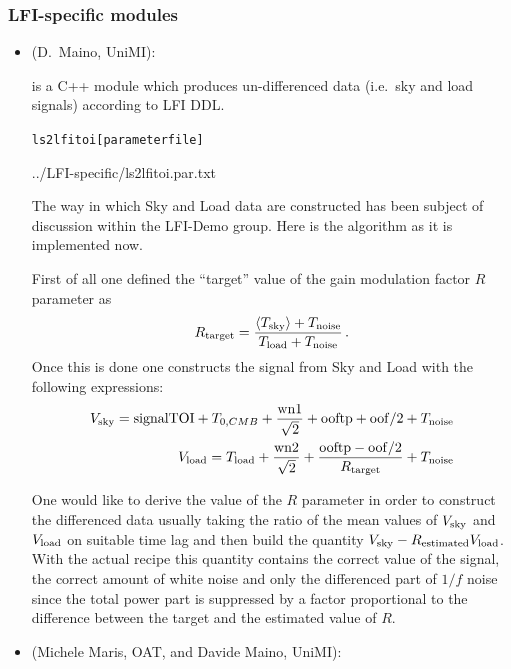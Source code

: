 \subsubsection{LFI-specific modules}

\begin{itemize}
\item {} (D.~Maino, UniMI):

 is a C++ module which produces un-differenced data
(i.e.\ sky and load signals) according to LFI DDL.

\begin{alltt}
ls2lfitoi [parameter file]
\end{alltt}
 {../LFI-specific/ls2lfitoi.par.txt}

The way in which Sky and Load data are constructed has been subject
of discussion within the LFI-Demo group. Here is the algorithm as
it is implemented now.

First of all one defined the ``target'' value of the gain modulation
factor $R$ parameter as
\begin{equation}
R_{\rm target} = \frac{\langle T_{\rm sky}\rangle
                 + T_{\rm noise}}{T_{\rm load} + T_{\rm noise}}\, .
\end{equation}
Once this is done one constructs the signal from Sky and Load with the
following expressions:
\begin{eqnarray}
V_{\rm sky} = {\rm signal TOI} + T_{0,CMB} + \frac{\rm wn1}{\sqrt{2}}
            + {\rm ooftp} + {\rm oof/2} + T_{\rm noise}\\
V_{\rm load} = T_{\rm load} + \frac{\rm wn2}{\sqrt{2}} +
             \frac{{\rm ooftp - oof/2}}{R_{\rm target}} + T_{\rm noise}
\end{eqnarray}

One would like to derive the value of the $R$ parameter in order
to construct the differenced data usually taking the ratio of the mean
values of $V_{\rm sky}$ and $V_{\rm load}$
on suitable time lag and then build the quantity
$V_{\rm sky} - R_{\rm estimated} V_{\rm load}$. With
the actual recipe this quantity contains the correct value of the
signal, the correct amount of white noise and only the differenced part
of $1/f$ noise since the total power part is suppressed by
a factor proportional to the difference between the target and the
estimated value of $R$.

\item {} (Michele Maris, OAT, and Davide Maino, UniMI):


\end{itemize}
